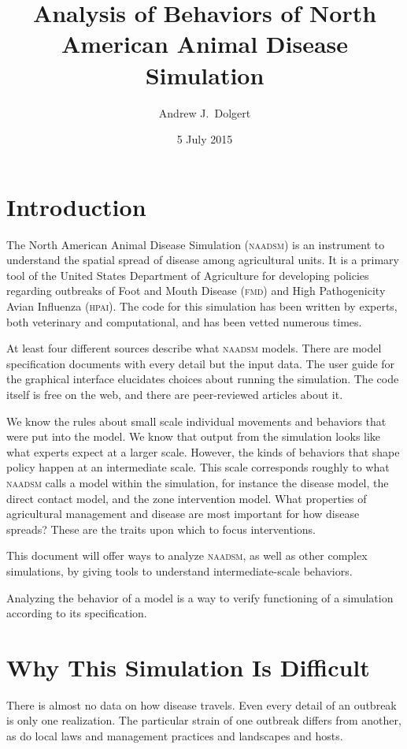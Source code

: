 \documentclass{article}
\title{Analysis of Behaviors of North American Animal Disease Simulation}
\author{Andrew J.\ Dolgert}
\date{5 July 2015}
\newcommand{\naadsm}{\textsc{naadsm}\xspace}
\newcommand{\hpai}{\textsc{hpai}\xspace}
\newcommand{\fmd}{\textsc{fmd}\xspace}
\begin{document}
\maketitle

\section{Introduction}
The North American Animal Disease Simulation (\naadsm) is an instrument to
understand the spatial spread of disease among agricultural units.
It is a primary tool of the United States Department of Agriculture
for developing policies regarding outbreaks of Foot and Mouth Disease
(\fmd) and High Pathogenicity Avian Influenza (\hpai).
The code for this simulation has been written by experts, both
veterinary and computational, and has been vetted numerous times.

At least four different sources describe what \naadsm models.
There are model specification documents with every detail but
the input data. The user guide for the graphical interface
elucidates choices about running the simulation. The code itself
is free on the web, and there are peer-reviewed articles about it.

We know the rules about small scale individual movements and behaviors that
were put into the model. We know that output from the simulation
looks like what experts expect at a larger scale.
However, the kinds of behaviors that shape policy happen at
an intermediate scale. This scale corresponds roughly to
what \naadsm calls a model within the simulation, for instance
the disease model, the direct contact model,
and the zone intervention model. What properties of agricultural
management and disease are most important for how disease spreads?
These are the traits upon which to focus interventions.

This document will offer ways to analyze \naadsm, as well
as other complex simulations, by giving tools to understand
intermediate-scale behaviors.

Analyzing the behavior of a model is a way to verify
functioning of a simulation according to its specification.


\section{Why This Simulation Is Difficult}

There is almost no data on how disease travels.
Even every detail of an outbreak is only one realization.
The particular strain of one outbreak differs from another,
as do local laws and management practices and landscapes
and hosts.
\end{document}
